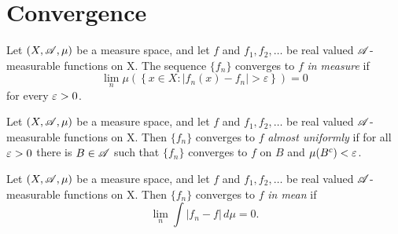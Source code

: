 \documentclass[12pt]{article}
\begin{document}
\section{Convergence}
\begin{definition}
    Let $(X,\mathscr{A},\mu)$ be a measure space, and let $f$ and $f_1,f_2,\dots$ be real valued $\mathscr{A}$-measurable functions on X. The sequence $\{f_n\}$ converges to $f$ \textit{in measure} if 
    \begin{equation*}
        \lim_n\mu\left(\left\{ x\in X: |f_n(x)-f_n|>\varepsilon\right\} \right)=0
    \end{equation*}
    for every $\varepsilon>0$.
\end{definition}
\begin{definition}
    Let $(X,\mathscr{A},\mu)$ be a measure space, and let $f$ and $f_1,f_2,\dots$ be real valued $\mathscr{A}$-measurable functions on X. Then $\{f_n\}$ converges to $f$ \textit{almost uniformly} if for all $\varepsilon>0$ there is $B\in \mathscr{A}$ such that $\{f_n\}$ converges to $f$ on $B$ and $\mu(B^c)<\varepsilon$.
\end{definition}
\begin{definition}
    Let $(X,\mathscr{A},\mu)$ be a measure space, and let $f$ and $f_1,f_2,\dots$ be real valued $\mathscr{A}$-measurable functions on X. Then $\{f_n\}$ converges to $f$ \textit{in mean} if 
    \begin{equation*}
        \lim_n \int |f_n-f| \, d\mu =0.
    \end{equation*}
\end{definition}
\end{document}

